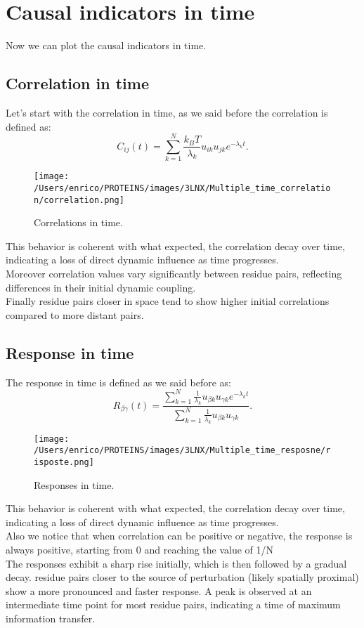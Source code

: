 \documentclass[English, Lau, oneside]{sapthesis}
\begin{document}
\section{Causal indicators in time}
\noindent Now we can plot the causal indicators in time.
\subsection{Correlation in time}
\noindent Let's start with the correlation in time, as we said before the correlation is defined as:
\[
C_{ij}(t) = \sum_{k=1}^N \frac{k_B T}{\lambda_k} u_{ik} u_{jk} e^{-\lambda_k t}.
\]
\begin{figure}[h!]
    \centering
    \texttt{[image: /Users/enrico/PROTEINS/images/3LNX/Multiple\_time\_correlation/correlation.png]}    
    \caption{Correlations in time.}
\end{figure}
This behavior is coherent with what expected, the correlation decay over time, indicating a loss of direct dynamic influence as time progresses.\\
Moreover correlation values vary significantly between residue pairs, reflecting differences in their initial dynamic coupling.\\
Finally residue pairs closer in space tend to show higher initial correlations compared to more distant pairs.

\subsection{Response in time}
\noindent The response in time is defined as we said before as:
\[
R_{\beta\gamma}(t) = \frac{\sum_{k=1}^N \frac{1}{\lambda_k} u_{\beta k} u_{\gamma k} e^{-\lambda_k t}}{\sum_{k=1}^N \frac{1}{\lambda_k} u_{\beta k} u_{\gamma k}}.
\]

\begin{figure}[h!]
    \centering
    \texttt{[image: /Users/enrico/PROTEINS/images/3LNX/Multiple\_time\_resposne/risposte.png]}    
    \caption{Responses in time.}
\end{figure}

This behavior is coherent with what expected, the correlation decay over time, indicating a loss of direct dynamic influence as time progresses.\\
Also we notice that when correlation can be positive or negative, the response is always positive, starting from 0 and reaching the value of 1/N\\
The responses exhibit a sharp rise initially, which is then followed by a gradual decay.
residue pairs closer to the source of perturbation (likely spatially proximal) show a more pronounced and faster response.
A peak is observed at an intermediate time point for most residue pairs, indicating a time of maximum information transfer.
        
\end{document}
